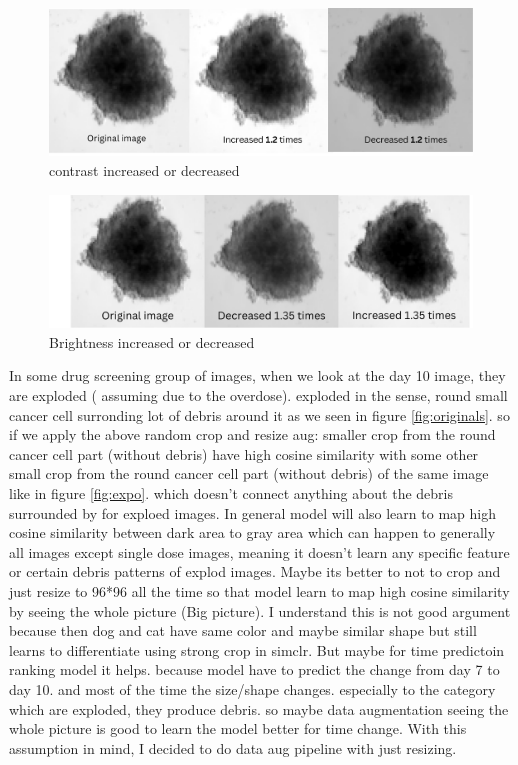   \begin{figure}[H]
    \centering
    \includegraphics[scale=0.4]{figures/bright.png} 
    \caption{contrast increased or decreased}
    \label{fig:bright}
  \end{figure}

  \begin{figure}[H]
    \centering
    \includegraphics[scale=0.5]{figures/contra.png} 
    \caption{Brightness increased or decreased}
    \label{fig:contra}
  \end{figure}

 In some drug screening group of images, when we look at the day 10 image, they are exploded ( assuming due to the overdose). exploded in the sense, round 
 small cancer cell surronding lot of debris around it as we seen in figure \ref{fig:originals}. so if we apply the above random crop and resize aug: smaller crop from the round cancer cell part (without 
 debris) have high cosine similarity with some other small crop from the round cancer cell part (without debris) of the same image like in figure \ref{fig:expo}. which doesn't connect anything
  about the debris surrounded by for exploed images. In general model will also learn to map high cosine similarity between dark area to gray area which can happen
to generally all images except single dose images, meaning it doesn't learn any specific feature or certain debris patterns of explod images.
Maybe its better to not to crop and just resize to 96*96 all the time so that model learn to map high cosine similarity by seeing the whole picture (Big picture).
I understand this is not good argument because then dog and cat have same color and maybe similar shape but still learns to differentiate using strong crop in simclr.
But maybe for time predictoin ranking model it helps. because model have to predict the change from day 7 to day 10. and most of the time the size/shape changes. 
especially to the category which are exploded, they produce debris. so maybe data augmentation seeing the whole picture is good to learn the model better for time 
change.  With this assumption in mind, I decided to do data aug pipeline with just resizing.

